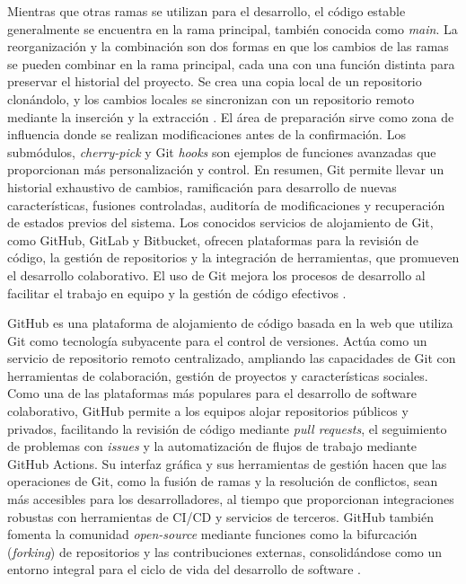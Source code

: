 {{        Mientras que otras ramas se utilizan para el desarrollo, el código estable 
        generalmente se encuentra en la rama principal, también conocida como \textit{main}. 
        La reorganización y la combinación son dos formas en que los cambios de las ramas 
        se pueden combinar en la rama principal, cada una con una función distinta para 
        preservar el historial del proyecto. Se crea una copia local de un repositorio 
        clonándolo, y los cambios locales se sincronizan con un repositorio remoto mediante 
        la inserción y la extracción \citep{ghodke2024git}. El área de preparación sirve como 
        zona de influencia donde se realizan modificaciones antes de la confirmación. Los 
        submódulos, \textit{cherry-pick} y Git \textit{hooks} son ejemplos de funciones 
        avanzadas que proporcionan más personalización y control. En resumen, 
        Git permite llevar un historial exhaustivo de cambios, ramificación para
        desarrollo de nuevas características, fusiones controladas, auditoría de
        modificaciones y recuperación de estados previos del sistema.
        Los conocidos servicios de 
        alojamiento de Git, como GitHub, GitLab y Bitbucket, ofrecen plataformas para la 
        revisión de código, la gestión de repositorios y la integración de herramientas, que 
        promueven el desarrollo colaborativo. El uso de Git mejora los procesos de desarrollo 
        al facilitar el trabajo en equipo y la gestión de código efectivos 
        \citep{ponuthorai2022git}.
        
        GitHub es una plataforma de alojamiento de código basada en la web que utiliza Git 
        como tecnología subyacente para el control de versiones. Actúa como un servicio de 
        repositorio remoto centralizado, ampliando las capacidades de Git con herramientas 
        de colaboración, gestión de proyectos y características sociales. Como una de las 
        plataformas más populares para el desarrollo de software colaborativo, GitHub permite 
        a los equipos alojar repositorios públicos y privados, facilitando la revisión de 
        código mediante \textit{pull requests}, el seguimiento de problemas con \textit{issues} 
        y la automatización de flujos de trabajo mediante GitHub Actions. Su interfaz gráfica 
        y sus herramientas de gestión hacen que las operaciones de Git, como la fusión de ramas 
        y la resolución de conflictos, sean más accesibles para los desarrolladores, al tiempo 
        que proporcionan integraciones robustas con herramientas de \ac{CI/CD} y servicios de 
        terceros. GitHub también fomenta la comunidad \textit{open-source} mediante funciones 
        como la bifurcación (\textit{forking}) de repositorios y las contribuciones externas, 
        consolidándose como un entorno integral para el ciclo de vida del desarrollo de software 
        \citep{github2024, ghodke2024git}.
    
}}
